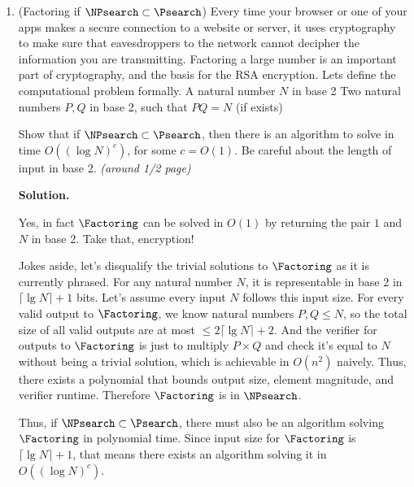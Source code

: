 \documentclass[11pt]{article}
\newenvironment{soln}{%
  \par\medskip\noindent\begingroup\color{blue}\textbf{Solution.}\ %
}{%
  \endgroup\par\medskip%
}
\begin{document}
\begin{enumerate}
\begin{soln}
Since $\FlipFourSAT$ has an output of exactly $n+1$ elements long, and since that output is verifiable (by substituting into the 4-CNF) with time on the order of number of clauses in the 4-CNF, we can say the problem has short outputs and is quickly verifiable. And since we've shown a polynomial time reduction from $\ThreeSAT$, we can say$\FlipFourSAT$ is $\NPsearch$-complete.
\end{soln}

\item (Factoring if $\NPsearch\subset \Psearch$) Every time your browser or one of your apps makes a secure connection to a website or server, it uses cryptography to make sure that eavesdroppers to the network cannot decipher the information you are transmitting. Factoring a large number is an important part of cryptography, and the basis for the RSA encryption. Lets define the computational problem formally.
\compprob{\Factoring}
        {A natural number $N$ in base 2}
        {Two natural numbers $P,Q$ in base 2, such that $PQ=N$ (if exists)}

Show that if $\NPsearch\subset \Psearch$, then there is an algorithm to solve \Factoring in time $O((\log N)^c)$, for some $c=O(1)$. Be careful about the length of input in base 2. \textit{(around 1/2 page)}

\begin{soln}
Yes, in fact $\Factoring$ can be solved in $O(1)$ by returning the pair $1$ and $N$ in base 2. Take that, encryption!

Jokes aside, let's disqualify the trivial solutions to $\Factoring$ as it is currently phrased. For any natural number $N$, it is representable in base 2 in $\lceil\lg N\rceil+1$ bits. Let's assume every input $N$ follows this input size. For every valid output to $\Factoring$, we know natural numbers $P,Q\leq N$, so the total size of all valid outputs are at most $\leq2\lceil\lg N\rceil+2$. And the verifier for outputs to $\Factoring$ is just to multiply $P\times Q$ and check it's equal to $N$ without being a trivial solution, which is achievable in $O(n^2)$ naively. Thus, there exists a polynomial that bounds output size, element magnitude, and verifier runtime. Therefore $\Factoring$ is in $\NPsearch$.

Thus, if $\NPsearch\subset\Psearch$, there must also be an algorithm solving $\Factoring$ in polynomial time. Since input size for $\Factoring$ is $\lceil\lg N\rceil+1$, that means there exists an algorithm solving it in $O((\log N)^c)$.
\end{soln}


\end{enumerate}
\end{document}
